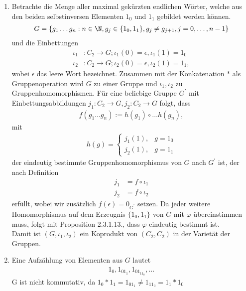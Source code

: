 \begin{solution}
\begin{enumerate}
  \item Betrachte die Menge aller maximal gekürzten endlichen Wörter, welche aus den beiden
  selbstinversen Elementen $1_0$ und $1_1$ gebildet werden können.
  \begin{align*}
  G = \{g_1\dots g_n: n \in \N, g_j \in\{1_0,1_1\}, g_j \neq g_{j+1}, j = 0,\dots,n-1\}
  \end{align*}
  und die Einbettungen
  \begin{align*}
    \iota_1&: C_2 \to G; \iota_1(0) = \epsilon, \iota_1(1) = 1_0 \\
    \iota_2&: C_2 \to G; \iota_2(0) = \epsilon, \iota_2(1) = 1_1,
  \end{align*}
  wobei $\epsilon$ das leere Wort bezeichnet.
  Zusammen mit der Konkatenation $*$ als Gruppenoperation wird $G$ zu einer Gruppe
  und $\iota_1,\iota_2$ zu Gruppenhomomorphismen.
  Für eine beliebige Gruppe $G^{\prime}$ mit Einbettungsabbildungen $j_1: C_2 \to G,
  j_2: C_2 \to G$ folgt, dass
  \begin{align*}
    f(g_1\dots g_n) := h(g_1)\circ\dots h(g_n),
  \end{align*}
  mit
  \begin{align*}
    h(g) = \begin{cases}
      j_1(1), & g = 1_0 \\
      j_2(1), & g = 1_1
    \end{cases}
  \end{align*}
  der eindeutig bestimmte Gruppenhomomorphismus von $G$ nach $G^{\prime}$
  ist, der nach Definition
  \begin{align*}
    j_1 &= f \circ \iota_1 \\
    j_2 &= f \circ \iota_2
  \end{align*}
  erfüllt, wobei wir zusätzlich $f(\epsilon) = 0_{G^\prime}$ setzen.
  Da jeder weitere Homomorphismus auf dem Erzeugnis $\{1_0,1_1\}$ von $G$
  mit $\varphi$ übereinstimmen muss, folgt mit Proposition 2.3.1.13., dass
  $\varphi$ eindeutig bestimmt ist. \\
  Damit ist $(G,\iota_1,\iota_2)$ ein Koprodukt von $(C_2,C_2)$ in der Varietät
  der Gruppen.
  \item Eine Aufzählung von Elementen aus $G$ lautet
  \begin{align*}
    1_0,1_01_1,1_01_11_0,\dots
  \end{align*}
  G ist nicht kommutativ, da $1_0*1_1 = 1_01_1 \neq 1_11_0 = 1_1*1_0$

\end{enumerate}
\end{solution}
